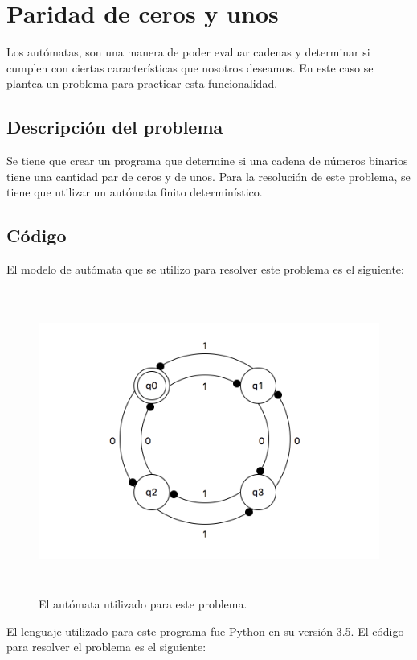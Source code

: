 \documentclass[12pt]{article}
\begin{document}
\newpage
\section{Paridad de ceros y unos}
Los autómatas, son una manera de poder evaluar cadenas y determinar si cumplen con ciertas características que nosotros deseamos. En este caso se plantea un problema para practicar esta funcionalidad.

\subsection{Descripción del problema}
Se tiene que crear un programa que determine si una cadena de números binarios tiene una cantidad par de ceros y de unos. Para la resolución de este problema, se tiene que utilizar un autómata finito determinístico.

\subsection{Código}
El modelo de autómata que se utilizo para resolver este problema es el siguiente:

\begin{figure}[H]
\includegraphics[width=\textwidth, height=10cm]{automata_paridad}
\caption{El autómata utilizado para este problema.}
\label{fig:automata_paridad_modelo}
\end{figure}

El lenguaje utilizado para este programa fue Python en su versión 3.5. El código para resolver el problema es el siguiente:\\
\end{document}
